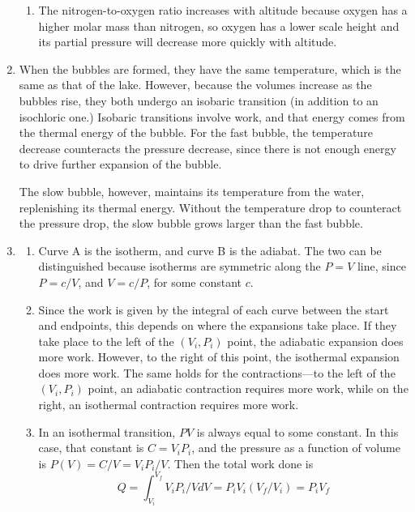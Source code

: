 \documentclass[fleqn]{article}[12pt]
\begin{document}
\begin{enumerate}
\begin{enumerate}
        \item The nitrogen-to-oxygen ratio increases with altitude because oxygen has a higher molar mass than nitrogen, so oxygen has a lower scale height and its partial pressure will decrease more quickly with altitude.
    \end{enumerate}

    \item When the bubbles are formed, they have the same temperature, which is the same as that of the lake. However, because the volumes increase as the bubbles rise, they both undergo an isobaric transition (in addition to an isochloric one.) Isobaric transitions involve work, and that energy comes from the thermal energy of the bubble. For the fast bubble, the temperature decrease counteracts the pressure decrease, since there is not enough energy to drive further expansion of the bubble.

    The slow bubble, however, maintains its temperature from the water, replenishing its thermal energy. Without the temperature drop to counteract the pressure drop, the slow bubble grows larger than the fast bubble.

    \item \begin{enumerate}
        \item Curve A is the isotherm, and curve B is the adiabat. The two can be distinguished because isotherms are symmetric along the $P=V$ line, since $P = c/V$, and $V = c/P$, for some constant $c$.

        \item Since the work is given by the integral of each curve between the start and endpoints, this depends on where the expansions take place. If they take place to the left of the $(V_i,P_i)$ point, the adiabatic expansion does more work. However, to the right of this point, the isothermal expansion does more work. The same holds for the contractions---to the left of the $(V_i,P_i)$ point, an adiabatic contraction requires more work, while on the right, an isothermal contraction requires more work.

        \item In an isothermal transition, $PV$ is always equal to some constant. In this case, that constant is $C = V_iP_i$, and the pressure as a function of volume is $P(V) = C/V = V_iP_i/V$. Then the total work done is
        \begin{equation*}
            Q = \int_{V_i}^{V_f} V_iP_i/V dV = P_iV_i(V_f/V_i) = P_iV_f
        \end{equation*}


\end{enumerate}
\end{enumerate}
\end{document}

